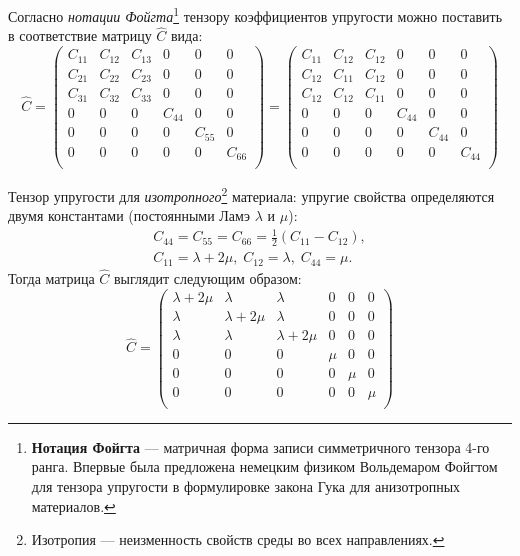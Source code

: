 \documentclass[12pt, a4paper]{article}
\begin{document}
	Согласно \textit{нотации Фойгта}\footnote{\textbf{Нотация Фойгта} --- матричная форма записи симметричного тензора 4-го ранга. Впервые была предложена немецким физиком Вольдемаром Фойгтом для тензора упругости в формулировке закона Гука для анизотропных материалов.} тензору коэффициентов упругости можно поставить в соответствие матрицу $\hat{C}$ вида:
	 \[
	\hat{C} = 
	\begin{pmatrix}
		C_{11} & C_{12} & C_{13} & 0 & 0 & 0 \\
		C_{21} & C_{22} & C_{23} & 0 & 0 & 0 \\
		C_{31} & C_{32} & C_{33} & 0 & 0 & 0 \\
		0 &      0 &      0 & C_{44} & 0 & 0 \\
		0 &      0 &      0 & 0 & C_{55} & 0 \\
		0 &      0 &      0 & 0 & 0 & C_{66} \\
	\end{pmatrix} 
	=
	\begin{pmatrix}
		C_{11} & C_{12} & C_{12} & 0 & 0 & 0 \\
		C_{12} & C_{11} & C_{12} & 0 & 0 & 0 \\
		C_{12} & C_{12} & C_{11} & 0 & 0 & 0 \\
		0 &      0 &      0 & C_{44} & 0 & 0 \\
		0 &      0 &      0 & 0 & C_{44} & 0 \\
		0 &      0 &      0 & 0 & 0 & C_{44} \\
	\end{pmatrix} 
	\] 
	
	Тензор упругости для \textit{изотропного}\footnote{Изотропия --- неизменность свойств среды во всех направлениях.} материала: упругие свойства определяются двумя константами (постоянными Ламэ $\lambda \text{ и } \mu$):
	\begin{gather*}
	C_{44}=C_{55}=C_{66}=\frac12(C_{11}-C_{12}),\\
	C_{11} =\lambda+2\mu,\;C_{12} = \lambda,\; C_{44} = \mu.
	\end{gather*}
	Тогда матрица $\hat{C}$ выглядит следующим образом:
	\begin{equation}
		\hat{C} = 
		\begin{pmatrix}
			\lambda + 2\mu & \lambda & \lambda & 0 & 0 & 0 \\
			\lambda & \lambda + 2\mu & \lambda & 0 & 0 & 0 \\
			\lambda & \lambda & \lambda + 2\mu & 0 & 0 & 0 \\
			0 &      0 &      0 & \mu & 0 & 0 \\
			0 &      0 &      0 & 0 & \mu & 0 \\
			0 &      0 &      0 & 0 & 0 & \mu \\
		\end{pmatrix} 
		\label{Flex}
	\end{equation}
\end{document}
